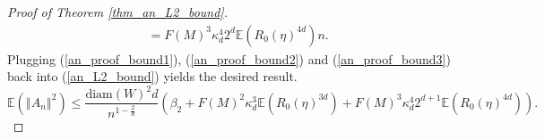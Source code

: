 \documentclass{article}
\newcommand{\EE}{\mathbb{E}}
\theoremstyle{plain}
\theoremstyle{remark}
\theoremstyle{definition}
\begin{document}
\begin{proof}[Proof of Theorem \ref{thm_an_L2_bound}]
\begin{align}
    &= F(M)^3\kappa_d^4 2^d \EE(R_0(\eta)^{4d}) n.\label{an_proof_bound3}
\end{align}
Plugging (\ref{an_proof_bound1}), (\ref{an_proof_bound2}) and (\ref{an_proof_bound3}) back into (\ref{an_L2_bound}) yields the desired result.
\[ \EE\left( \left\Vert A_n \right\Vert^2 \right) \leq \frac{\mathrm{diam}(W)^2d}{n^{1-\frac{2}{d}}}\left(\beta_2 + F(M)^2\kappa_d^3\EE\left(R_0(\eta)^{3d}\right) + F(M)^3\kappa_d^4 2^{d+1} \EE\left(R_0(\eta)^{4d}\right) \right).\]
\end{proof}





\newpage

\end{document}
